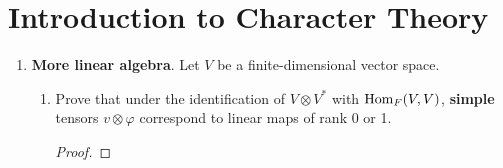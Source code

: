 \documentclass[../psets.tex]{subfiles}
\begin{document}
\section{Introduction to Character Theory}
\begin{enumerate}
    \item {}\textbf{More linear algebra}. Let $V$ be a finite-dimensional vector space.
    \begin{enumerate}
        \item Prove that under the identification of $V\otimes V^*$ with $\operatorname{Hom}_F(V,V)$, \textbf{simple} tensors $v\otimes\varphi$ correspond to linear maps of rank 0 or 1.
        \begin{proof}


\end{proof}
\end{enumerate}
\end{enumerate}
\end{document}
